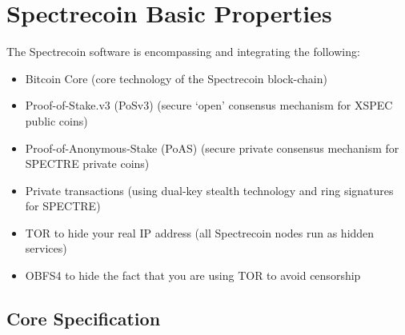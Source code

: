 \section{Spectrecoin Basic Properties}
The Spectrecoin software is encompassing and integrating the following:

\begin{itemize}
	\item Bitcoin Core (core technology of the Spectrecoin block-chain)
	\item Proof-of-Stake.v3 (PoSv3) (secure ‘open’ consensus mechanism for XSPEC public coins)
	\item Proof-of-Anonymous-Stake (PoAS) (secure private consensus mechanism for SPECTRE private coins)
	\item Private transactions (using dual-key stealth technology and ring signatures for SPECTRE)
	\item TOR to hide your real IP address (all Spectrecoin nodes run as hidden services)
	\item OBFS4 to hide the fact that you are using TOR to avoid censorship
\end{itemize}



\subsection{Core Specification}


